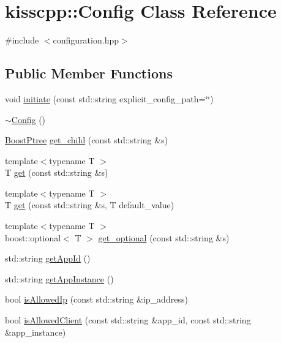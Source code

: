 \hypertarget{classkisscpp_1_1_config}{\section{kisscpp\-:\-:Config Class Reference}
\label{classkisscpp_1_1_config}
}


{\ttfamily \#include $<$configuration.\-hpp$>$}

\subsection*{Public Member Functions}
\begin{DoxyCompactItemize}
\item 
void \hyperlink{classkisscpp_1_1_config_a3d46f787270d6aeac04635c04936c404}{initiate} (const std\-::string explicit\-\_\-config\-\_\-path=\char`\"{}\char`\"{})
\item 
\hyperlink{classkisscpp_1_1_config_ae6fd9d0a11285f8dd5658bf07f728e01}{$\sim$\-Config} ()
\item 
\hyperlink{boost__ptree_8hpp_ab36820650b8e0db36402aea80485633c}{Boost\-Ptree} \hyperlink{classkisscpp_1_1_config_a01804b8d8d9c4f3965fd2dd43a46ee83}{get\-\_\-child} (const std\-::string \&s)
\item 
{\footnotesize template$<$typename T $>$ }\\T \hyperlink{classkisscpp_1_1_config_ae237509831f23cd9cbfc67dcd6ed8c9d}{get} (const std\-::string \&s)
\item 
{\footnotesize template$<$typename T $>$ }\\T \hyperlink{classkisscpp_1_1_config_a747baa092e702cb9a42f9c4c74958ddd}{get} (const std\-::string \&s, T default\-\_\-value)
\item 
{\footnotesize template$<$typename T $>$ }\\boost\-::optional$<$ T $>$ \hyperlink{classkisscpp_1_1_config_a0b0267e59a04df930282c0b39e7f79dd}{get\-\_\-optional} (const std\-::string \&s)
\item 
std\-::string \hyperlink{classkisscpp_1_1_config_a5f970e234e909ccb7b18bf4e7705e336}{get\-App\-Id} ()
\item 
std\-::string \hyperlink{classkisscpp_1_1_config_a9a68e47e345ee1fa208397f1c19859f2}{get\-App\-Instance} ()
\item 
bool \hyperlink{classkisscpp_1_1_config_a9b6825f6980d6caa4780567936ce77a6}{is\-Allowed\-Ip} (const std\-::string \&ip\-\_\-address)
\item 
bool \hyperlink{classkisscpp_1_1_config_afb8591ec6e7e7cd86e151f45c7c8ba3b}{is\-Allowed\-Client} (const std\-::string \&app\-\_\-id, const std\-::string \&app\-\_\-instance)
\end{DoxyCompactItemize}
